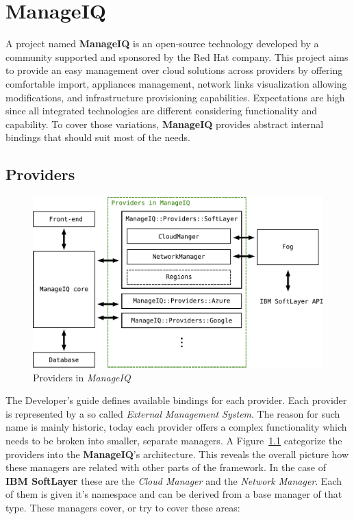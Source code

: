 \chapter{ManageIQ}
\label{chap:ManageIQ}

A project named \textbf{ManageIQ} is an open-source technology developed by a community supported and sponsored by the Red Hat company. This project aims to provide an easy management over cloud solutions across providers by offering comfortable import, appliances management, network links visualization allowing modifications, and infrastructure provisioning capabilities\cite{lwn}. Expectations are high since all integrated technologies are different considering functionality and capability. To cover those variations, \textbf{ManageIQ} provides abstract internal bindings that should suit most of the needs.

\section{Providers}
\label{sec:Providers}

\begin{figure}[ht!]
	\includegraphics[width=\textwidth]{fig/architecture}
	\caption{Providers in \emph{ManageIQ}}\label{fig:Providers in ManageIQ}
\end{figure}

The Developer's guide\cite{manageiq_dev} defines available bindings for each provider. Each provider is represented by a so called \emph{External Management System}. The reason for such name is mainly historic, today each provider offers a complex functionality which needs to be broken into smaller, separate managers. A Figure~\ref{fig:Providers in ManageIQ}  categorize the providers into the \textbf{ManageIQ}'s architecture. This reveals the overall picture how these managers are related with other parts of the framework. In the case of \textbf{IBM SoftLayer} these are the \emph{Cloud Manager} and the \emph{Network Manager}. Each of them is given it's namespace and can be derived from a base manager of that type. These managers cover, or try to cover these areas:

